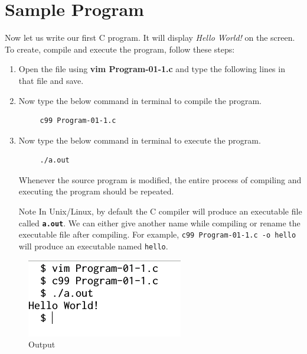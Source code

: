\documentclass[11pt,a4paper]{article}
\begin{document}
\section*{Sample Program}
Now let us write our first C program. It will display \emph{Hello World!} on the screen. To create, compile and execute the program, follow these steps:

\begin{enumerate}
\item Open the file using \textbf{vim Program-01-1.c} and type the following lines in that file and save.



\item Now type the below command in terminal to compile the program.
\begin{verbatim}
     c99 Program-01-1.c 
\end{verbatim}

\item Now type the below command in terminal to execute the program. 
\begin{verbatim}
     ./a.out
\end{verbatim}

Whenever the source program is modified, the entire process of compiling and executing the program should be repeated.
\begin{bclogo}[couleur=blue!5, arrondi=0.3, logo=\bctrombone]{Note}
In Unix/Linux, by default the C compiler will produce an executable file called \textbf{\texttt{a.out}}. We can either give another name while compiling or rename the executable file after compiling. For example, \texttt{c99 Program-01-1.c -o hello} will produce an executable named \texttt{hello}.
\end{bclogo}
\end{enumerate}

\begin{figure}[ht]
\begin{center}
\includegraphics{Output-01-1.png}
\caption{Output}
\label{output-01-1}
\end{center}
\end{figure}
\end{document}
